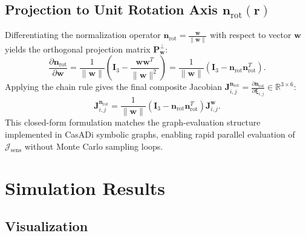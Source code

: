 \documentclass[11pt, a4paper]{article}
\begin{document}
\subsection{Projection to Unit Rotation Axis $\mathbf{n}_{\text{rot}}(\mathbf{r})$}
Differentiating the normalization operator $\mathbf{n}_{\text{rot}} = \frac{\mathbf{w}}{\|\mathbf{w}\|}$ with respect to vector $\mathbf{w}$ yields the orthogonal projection matrix $\mathbf{P}_{\mathbf{w}}^\perp$:
\begin{equation}
    \frac{\partial \mathbf{n}_{\text{rot}}}{\partial \mathbf{w}} = \frac{1}{\|\mathbf{w}\|} \left( \mathbf{I}_3 - \frac{\mathbf{w} \mathbf{w}^T}{\|\mathbf{w}\|^2} \right) = \frac{1}{\|\mathbf{w}\|} \left( \mathbf{I}_3 - \mathbf{n}_{\text{rot}} \mathbf{n}_{\text{rot}}^T \right).
\end{equation}
Applying the chain rule gives the final composite Jacobian $\mathbf{J}_{i,j}^{\mathbf{n}_{\text{rot}}} = \frac{\partial \mathbf{n}_{\text{rot}}}{\partial \boldsymbol{\xi}_{i,j}} \in \mathbb{R}^{3 \times 6}$:
\begin{equation}
    \mathbf{J}_{i,j}^{\mathbf{n}_{\text{rot}}} = \frac{1}{\|\mathbf{w}\|} \left( \mathbf{I}_3 - \mathbf{n}_{\text{rot}} \mathbf{n}_{\text{rot}}^T \right) \mathbf{J}_{i,j}^{\mathbf{w}}.
\end{equation}
This closed-form formulation matches the graph-evaluation structure implemented in CasADi symbolic graphs, enabling rapid parallel evaluation of $\mathcal{J}_{\text{sens}}$ without Monte Carlo sampling loops.

\section{Simulation Results}

\subsection{Visualization}
\end{document}
